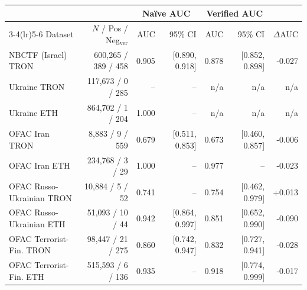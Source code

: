 \begin{tabular}{l r r r r r r}
\toprule
 & & \multicolumn{2}{c}{Naïve AUC} & \multicolumn{2}{c}{Verified AUC} & \\ 
\cmidrule(lr){3-4}\cmidrule(lr){5-6}
Dataset & $N$ / Pos / Neg$_\text{ver}$ & AUC & 95\% CI & AUC & 95\% CI & $\Delta$AUC \\
\midrule
NBCTF (Israel) TRON & 600,265 / 389 / 458 & 0.905 & [0.890, 0.918] & 0.878 & [0.852, 0.898] & -0.027 \\ 
Ukraine TRON & 117,673 / 0 / 285 & -- & -- & n/a & n/a & n/a \\ 
Ukraine ETH & 864,702 / 1 / 204 & 1.000 & -- & n/a & n/a & n/a \\ 
OFAC Iran TRON & 8,883 / 9 / 559 & 0.679 & [0.511, 0.853] & 0.673 & [0.460, 0.857] & -0.006 \\ 
OFAC Iran ETH & 234,768 / 3 / 29 & 1.000 & -- & 0.977 & -- & -0.023 \\ 
OFAC Russo-Ukrainian TRON & 10,884 / 5 / 52 & 0.741 & -- & 0.754 & [0.462, 0.979] & +0.013 \\ 
OFAC Russo-Ukrainian ETH & 51,093 / 10 / 44 & 0.942 & [0.864, 0.997] & 0.851 & [0.652, 0.990] & -0.090 \\ 
OFAC Terrorist-Fin. TRON & 98,447 / 21 / 275 & 0.860 & [0.742, 0.947] & 0.832 & [0.727, 0.941] & -0.028 \\ 
OFAC Terrorist-Fin. ETH & 515,593 / 6 / 136 & 0.935 & -- & 0.918 & [0.774, 0.999] & -0.017 \\ 
\bottomrule
\end{tabular}
